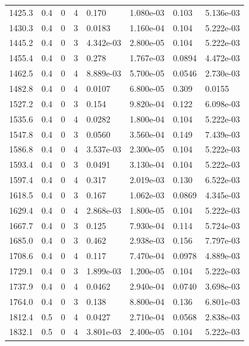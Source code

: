 \documentclass[preview]{standalone}
\begin{document}
{{{{\begin{tabular}{L{1.2cm}C{1.2cm} C{0.3cm}C{0.5cm} C{1.4cm}C{1.4cm} C{1.4cm}C{1.4cm}}
  1425.3  &   0.4  & 0     &  4 &  0.170  & 1.080e-03  & 0.103 &  5.136e-03   \\ 
  1430.3  &   0.4  & 0     &  3 &  0.0183  & 1.160e-04  & 0.104 &  5.222e-03   \\ 
  1445.2  &   0.4  & 0     &  3 &  4.342e-03  & 2.800e-05  & 0.104 &  5.222e-03   \\ 
  1455.4  &   0.4  & 0     &  3 &  0.278  & 1.767e-03  & 0.0894 &  4.472e-03   \\ 
  1462.5  &   0.4  & 0     &  4 &  8.889e-03  & 5.700e-05  & 0.0546 &  2.730e-03   \\ 
  1482.8  &   0.4  & 0     &  4 &  0.0107  & 6.800e-05  & 0.309 &  0.0155   \\ 
  1527.2  &   0.4  & 0     &  3 &  0.154  & 9.820e-04  & 0.122 &  6.098e-03   \\ 
  1535.6  &   0.4  & 0     &  4 &  0.0282  & 1.800e-04  & 0.104 &  5.222e-03   \\ 
  1547.8  &   0.4  & 0     &  3 &  0.0560  & 3.560e-04  & 0.149 &  7.439e-03   \\ 
  1586.8  &   0.4  & 0     &  4 &  3.537e-03  & 2.300e-05  & 0.104 &  5.222e-03   \\ 
  1593.4  &   0.4  & 0     &  3 &  0.0491  & 3.130e-04  & 0.104 &  5.222e-03   \\ 
  1597.4  &   0.4  & 0     &  4 &  0.317  & 2.019e-03  & 0.130 &  6.522e-03   \\ 
  1618.5  &   0.4  & 0     &  3 &  0.167  & 1.062e-03  & 0.0869 &  4.345e-03   \\ 
  1629.4  &   0.4  & 0     &  4 &  2.868e-03  & 1.800e-05  & 0.104 &  5.222e-03   \\ 
  1667.7  &   0.4  & 0     &  3 &  0.125  & 7.930e-04  & 0.114 &  5.724e-03   \\ 
  1685.0  &   0.4  & 0     &  3 &  0.462  & 2.938e-03  & 0.156 &  7.797e-03   \\ 
  1708.6  &   0.4  & 0     &  4 &  0.117  & 7.470e-04  & 0.0978 &  4.889e-03   \\ 
  1729.1  &   0.4  & 0     &  3 &  1.899e-03  & 1.200e-05  & 0.104 &  5.222e-03   \\ 
  1737.9  &   0.4  & 0     &  4 &  0.0462  & 2.940e-04  & 0.0740 &  3.698e-03   \\ 
  1764.0  &   0.4  & 0     &  3 &  0.138  & 8.800e-04  & 0.136 &  6.801e-03   \\ 
  1812.4  &   0.5  & 0     &  4 &  0.0427  & 2.710e-04  & 0.0568 &  2.838e-03   \\ 
  1832.1  &   0.5  & 0     &  4 &  3.801e-03  & 2.400e-05  & 0.104 &  5.222e-03   \\ 

\end{tabular}}}}}
\end{document}
